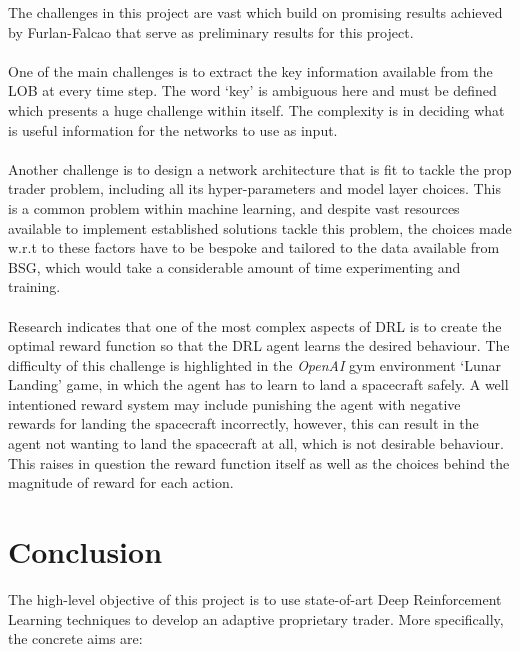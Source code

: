 \documentclass[ %
                    author={Ashwinder Khurana},
                supervisor={Prof Dave Cliff},
                    degree={MEng},
                     title={The Deeply Reinforced Trader},
                  subtitle={},
                      type={enterprise},
                      year={2020} ]{dissertation}
\begin{document}
The challenges in this project are vast which build on promising results achieved by Furlan-Falcao that serve as preliminary results for this project. 
\\
\\
One of the main challenges is to extract the key information available from the LOB at every time step. The word \enquote*{key} is ambiguous here and must be defined which presents a huge challenge within itself. The complexity is in deciding what is useful information for the networks to use as input. 
\\
\\
Another challenge is to design a network architecture that is fit to tackle the prop trader problem, including all its hyper-parameters and model layer choices. This is a common problem within machine learning, and despite vast resources available to implement established solutions tackle this problem, the choices made w.r.t to these factors have to be bespoke and tailored to the data available from BSG, which would take a considerable amount of time experimenting and training. 
\\
\\
Research indicates that one of the most complex aspects of DRL is to create the optimal reward function so that the DRL agent learns the desired behaviour. The difficulty of this challenge is highlighted in the \textit{OpenAI} gym environment \enquote*{Lunar Landing} game, in which the agent has to learn to land a spacecraft safely. A well intentioned reward system may include punishing the agent with negative rewards for landing the spacecraft incorrectly, however, this can result in the agent not wanting to land the spacecraft at all, which is not desirable behaviour. This raises in question the reward function itself as well as the choices behind the magnitude of reward for each action. 


\vspace{0.5cm}
\section{Conclusion}
\vspace{0.5cm} 

The high-level objective of this project is to use state-of-art Deep Reinforcement Learning techniques to develop an adaptive proprietary trader.  
More specifically, the concrete aims are:
\end{document}
